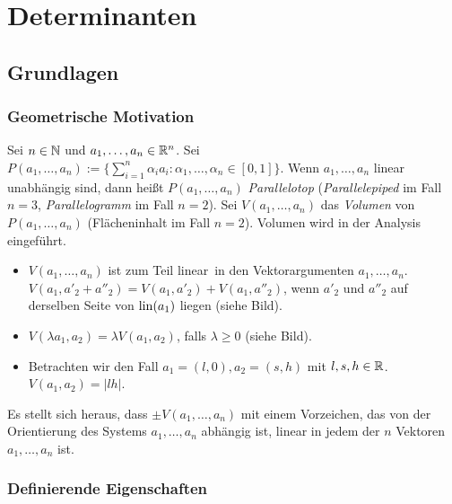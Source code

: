 
\section{Determinanten}

\label{Determinanten}

\subsection{Grundlagen}

\subsubsection{Geometrische Motivation}

Sei $ n \in \mathbb N $ und $ a_1, \ldots, a_n \in \mathbb R^n $. Sei $ P(a_1, \ldots, a_n) := \{ \sum_{i=1}^n \alpha_ia_i : \alpha_1, \ldots, \alpha_n \in [0,1] \} $. Wenn $ a_1, \ldots, a_n $ linear unabhängig sind, dann heißt $ P(a_1, \ldots, a_n) $ \emph{Parallelotop} (\emph{Parallelepiped} im Fall $ n=3 $, \emph{Parallelogramm} im Fall $ n=2 $). Sei $ V(a_1, \ldots, a_n) $ das \emph{Volumen} von $ P(a_1, \ldots, a_n) $ (Flächeninhalt im Fall $ n=2 $). Volumen wird in der Analysis eingeführt.
\begin{itemize}
	\item
		$ V(a_1, \ldots, a_n) $ ist \glqq zum Teil linear\grqq\ in den Vektorargumenten $ a_1, \ldots, a_n $. $ V(a_1, a'_2 + a''_2) = V(a_1,a'_2) + V(a_1,a''_2) $, wenn $ a'_2 $ und $ a''_2 $ auf derselben Seite von $ \operatorname{lin}(a_1) $ liegen (siehe Bild).
	\item
		$ V(\lambda a_1, a_2) = \lambda V(a_1, a_2) $, falls $ \lambda \geq 0 $ (siehe Bild).
	\item
		Betrachten wir den Fall $ a_1 = (l,0), a_2 = (s,h) $ mit $ l,s,h \in \mathbb R $. $ V(a_1,a_2) = |lh| $.
\end{itemize}
Es stellt sich heraus, dass $ \pm V(a_1, \ldots, a_n) $ mit einem Vorzeichen, das von der Orientierung des Systems $ a_1, \ldots, a_n $ abhängig ist, linear in jedem der $ n $ Vektoren $ a_1, \ldots, a_n $ ist.


\subsubsection{Definierende Eigenschaften}

